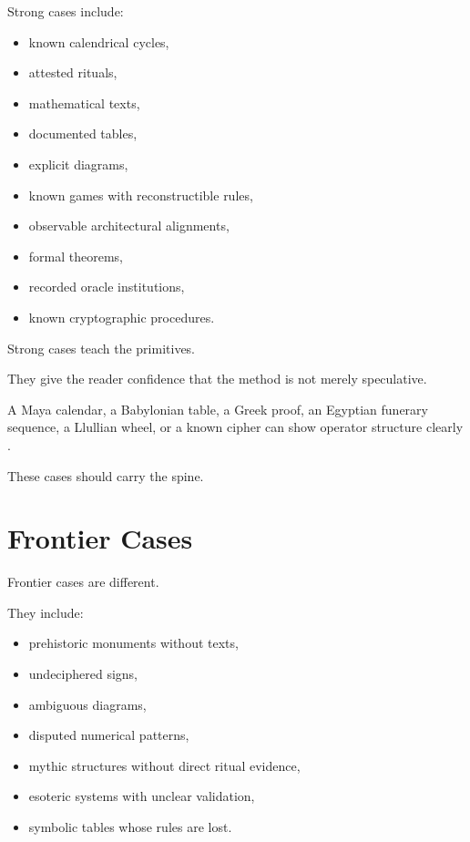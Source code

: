 \documentclass[11pt]{book}
\begin{document}
Strong cases include:

\begin{itemize}
    \item known calendrical cycles,
    \item attested rituals,
    \item mathematical texts,
    \item documented tables,
    \item explicit diagrams,
    \item known games with reconstructible rules,
    \item observable architectural alignments,
    \item formal theorems,
    \item recorded oracle institutions,
    \item known cryptographic procedures.
\end{itemize}

Strong cases teach the primitives.

They give the reader confidence that the method is not merely speculative.

A Maya calendar, a Babylonian table, a Greek proof, an Egyptian funerary sequence, a Llullian wheel, or a known cipher can show operator structure clearly \cite{BrickerBricker2011AstronomyMayaCodices,Neugebauer1957ExactSciences,EuclidHeath1956Elements,Hornung1999BooksAfterlife,Yates1966ArtMemory,Kahn1996Codebreakers}.

These cases should carry the spine.

\section{Frontier Cases}

Frontier cases are different.

They include:

\begin{itemize}
    \item prehistoric monuments without texts,
    \item undeciphered signs,
    \item ambiguous diagrams,
    \item disputed numerical patterns,
    \item mythic structures without direct ritual evidence,
    \item esoteric systems with unclear validation,
    \item symbolic tables whose rules are lost.
\end{itemize}
\end{document}

